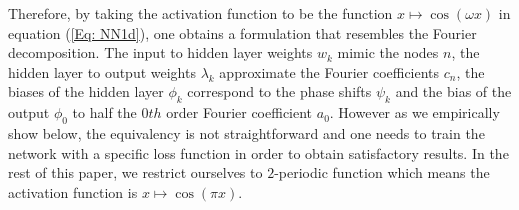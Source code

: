 \documentclass[AMS,STIX1COL]{WileyNJD-v2}
\begin{document}
Therefore, by taking the activation function to be the function $x \mapsto \cos(\omega x)$ in equation (\ref{Eq: NN1d}), one obtains a formulation that resembles the Fourier decomposition. The input to hidden layer weights $w_k$ mimic the nodes $n$, the hidden layer to output weights $\lambda_k$ approximate the Fourier coefficients $c_n$, the biases of the hidden layer $\phi_k$ correspond to the phase shifts $\psi_k$ and the bias of the output $\phi_0$ to half the $0th$ order Fourier coefficient $a_0$. However as we empirically show below, the equivalency is not straightforward and one needs to train the network with a specific loss function in order to obtain satisfactory results. In the rest of this paper, we restrict ourselves to $2$-periodic function which means the activation function is $x \mapsto \cos(\pi x)$.


\end{document}
